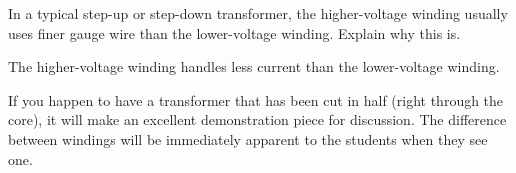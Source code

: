 

In a typical step-up or step-down transformer, the higher-voltage winding usually uses finer gauge wire than the lower-voltage winding.  Explain why this is.







The higher-voltage winding handles less current than the lower-voltage winding.







If you happen to have a transformer that has been cut in half (right through the core), it will make an excellent demonstration piece for discussion.  The difference between windings will be immediately apparent to the students when they see one.



